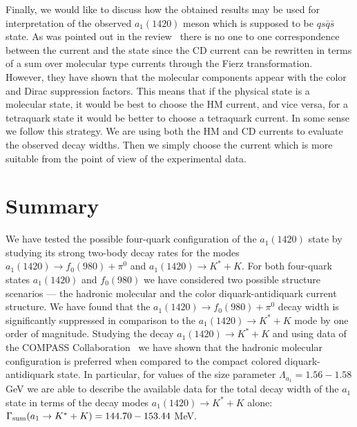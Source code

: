 \documentclass[aps,prd,floatfix,superscriptaddress,showpacs,showkeys]{revtex4}
\begin{document}
Finally, we would like to discuss how the obtained results may be used
for interpretation of the observed $a_1(1420)$ meson which is supposed
to be $qs\bar q \bar s$ state.  As was pointed out in the 
review~\cite{Nielsen:2009uh} there is no one to one correspondence
between the current and the state since the CD current can be rewritten
in terms of a sum over molecular type currents through the Fierz 
transformation. However, they have shown that the molecular components appear 
with the color and Dirac suppression factors. This means that if the physical
state is a molecular state, it would be best to choose the HM current,
and vice versa, for a tetraquark state it would be better to choose 
a tetraquark current. In some sense  we follow this strategy. We are using both
the HM and CD currents to evaluate the observed decay widths. Then we simply
choose the current which is more suitable from the point of view
of the experimental data.

\section{Summary}
\label{sec:Summary}

We have tested the possible four-quark configuration of the $a_1(1420)$ state 
by studying its strong two-body decay rates for the modes
$a_1(1420) \to f_0(980) + \pi^0$ and 
$a_1(1420) \to K^* + K$. For both four-quark states $a_1(1420)$
and $f_0(980)$  
we have considered two possible structure scenarios --- 
the hadronic molecular and the color diquark-antidiquark current structure. 
We have found that the $a_1(1420) \to f_0(980) + \pi^0$
decay width is significantly suppressed in comparison to the 
$a_1(1420) \to K^* + K$ mode by one order of magnitude. 
Studying the decay $a_1(1420) \to K^* + K$ and using data of the COMPASS 
Collaboration~\cite{Adolph:2015pws} we have shown that the hadronic molecular 
configuration is preferred when compared to the compact colored diquark-antidiquark state.
In particular, for values of the size parameter
$\Lambda_{a_1} = 1.56-1.58$ GeV 
we are able to describe the available data for the total decay width of the
$a_1$ state in terms of 
the decay modes $a_1(1420) \to K^* + K$ alone: 
$\Gamma_{\rm sum}(a_1 \to K^* + K) = 144.70 - 153.44$ MeV. 
\end{document}

